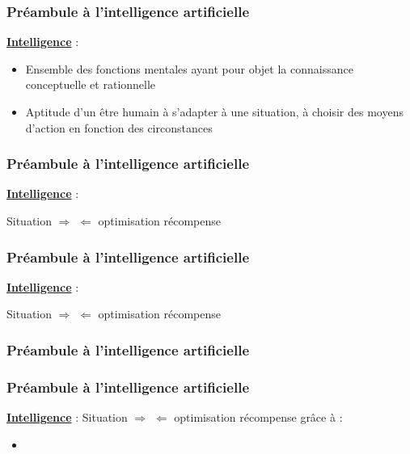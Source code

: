 \documentclass{formation}
\begin{document}
\begin{frame}
  \frametitle{Préambule à l'intelligence artificielle}
  \underline{\textbf{Intelligence}} :
  \begin{itemize}
  \item Ensemble des fonctions mentales ayant pour objet la connaissance conceptuelle et rationnelle
  \item Aptitude d'un être humain à s'adapter à une situation, à choisir des moyens d'action en fonction des circonstances
  \end{itemize}
  \begin{center}
  \end{center}
\end{frame}

\begin{frame}
  \frametitle{Préambule à l'intelligence artificielle}
  \underline{\textbf{Intelligence}} :
  \newline
  \newline
  \begin{center}
    Situation $\Rightarrow$  $\Leftarrow$ optimisation récompense
  \end{center}
\end{frame}

\begin{frame}
  \frametitle{Préambule à l'intelligence artificielle}
  \underline{\textbf{Intelligence}} :
  \newline
  \newline
  \begin{center}
    Situation $\Rightarrow$  $\Leftarrow$ optimisation récompense
    \newline
    \newline
  \end{center}
\end{frame}

\begin{frame}
  \frametitle{Préambule à l'intelligence artificielle}
\end{frame}

\begin{frame}
  \frametitle{Préambule à l'intelligence artificielle}
  \underline{\textbf{Intelligence}} :
  \newline
  \newline
  Situation $\Rightarrow$  $\Leftarrow$ optimisation récompense
  \newline
  \newline
  grâce à :
  \begin{itemize}
  \item {}
  \end{itemize}
\end{frame}
\end{document}
